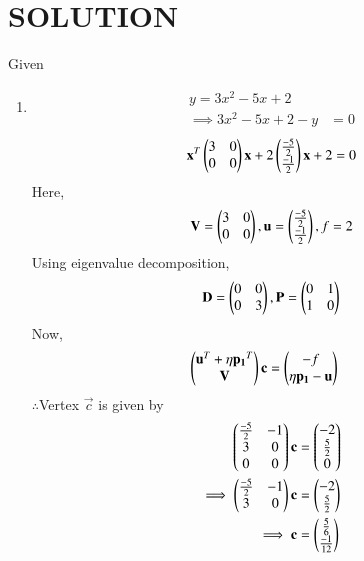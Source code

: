 \documentclass[journal,12pt,twocolumn]{IEEEtran}
\begin{document}
\section{SOLUTION}  
Given
\begin{enumerate}
\item
    \begin{align}
        y = 3x^2-5x+2\\
        \implies 3x^2-5x+2-y &=0
    \end{align}
    \begin{align}
    \mathbf{x}^T \begin{pmatrix}3 & 0\\0 & 0\end{pmatrix}\mathbf{x}+ 2\begin{pmatrix}\frac{-5}{2} \\ \frac{-1}{2}\end{pmatrix}\mathbf{x}+2=0
\end{align}
    Here,
    \begin{align}
        \mathbf{V} = \begin{pmatrix}3 & 0 \\ 0 & 0\end{pmatrix},\mathbf{u}=\begin{pmatrix}\frac{-5}{2} \\ \frac{-1}{2}\end{pmatrix},f=2
    \end{align}
     Using eigenvalue decomposition,
    \begin{align}
        \mathbf{D} = \begin{pmatrix}0 & 0\\0 & 3\end{pmatrix} ,\mathbf{P}=\begin{pmatrix}0 & 1\\1 & 0\end{pmatrix}
    \end{align}
Now,
\begin{align}
    \begin{pmatrix}\mathbf{u}^T + \eta\mathbf{p_1}^T \\ \mathbf{V}\end{pmatrix}\mathbf{c} &= \begin{pmatrix}-f \\ \eta\mathbf{p_1}-\mathbf{u}\end{pmatrix} 
\end{align}
    $\therefore$Vertex $\vec{c}$ is given by
    \begin{align}
        \begin{pmatrix}\frac{-5}{2} & -1 \\ 3 & 0 \\ 0 & 0\end{pmatrix}\mathbf{c} &= \begin{pmatrix}-2 \\ \frac{5}{2} \\ 0\end{pmatrix} \\
     \implies  \begin{pmatrix}\frac{-5}{2} & -1 \\ 3 & 0\end{pmatrix}\mathbf{c} &= \begin{pmatrix}-2 \\ \frac{5}{2}\end{pmatrix}
        \\
        \implies \mathbf{c} &= \begin{pmatrix}\frac{5}{6}\\\frac{-1}{12}\end{pmatrix}
    \end{align}
    

\end{enumerate}
\end{document}
